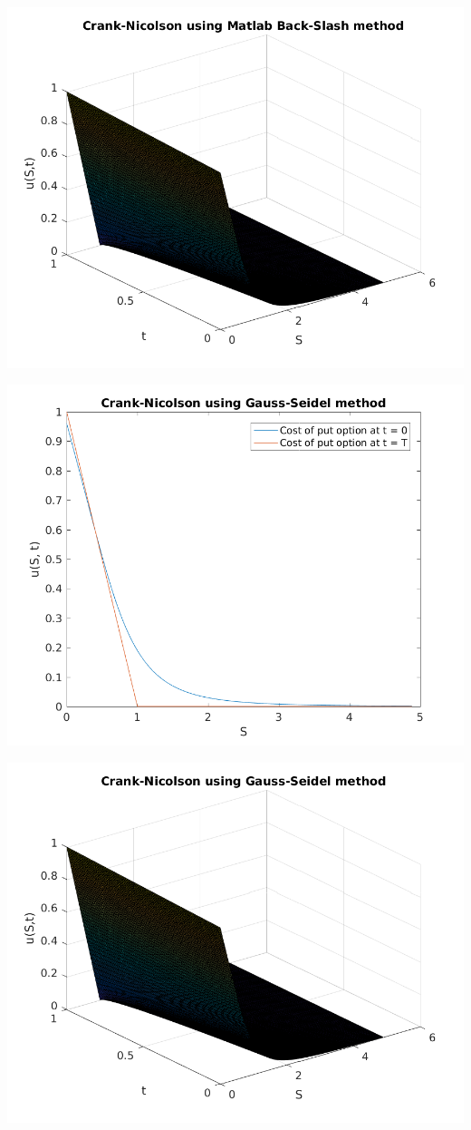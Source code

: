 \documentclass{article}
\begin{document}
\includegraphics{"q2_12"}
\pagebreak


\includegraphics{"q2_13"}
\pagebreak


\includegraphics{"q2_14"}
\pagebreak
\end{document}
